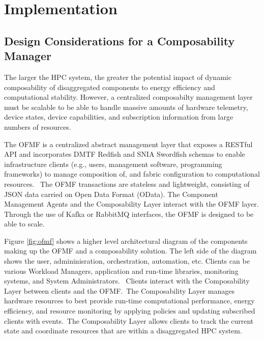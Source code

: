 \section{Implementation}

\subsection{Design Considerations for a Composability Manager}

The larger the HPC system, the greater the potential impact of dynamic composability of disaggregated components to energy efficiency and computational stability.  However, a centralized composabilty management layer must be scalable to be able to handle massive amounts of hardware telemetry, device states, device capabilities, and subscription information from large numbers of resources.  

The OFMF is a centralized abstract management layer that exposes a RESTful API \cite{restful} and incorporates DMTF Redfish \cite{redfish} and SNIA Swordfish \cite{swordfish} schemas to enable infrastructure clients (e.g., users, management software, programming frameworks) to manage composition of, and fabric configuration to computational resources.  The OFMF transactions are stateless and lightweight, consisting of JSON data carried on Open Data Format (OData).  The Component Management Agents and the Composability Layer interact with the OFMF layer.  Through the use of Kafka \cite{kafka} or RabbitMQ \cite{rabbitmq} interfaces, the OFMF is designed to be able to scale.

Figure \ref{fig:ofmf} shows a higher level architectural diagram of the components making up the OFMF and a composability solution.  The left side of the diagram shows the user, admininisration, orchestration, automation, etc. Clients can be various Workload Managers, application and run-time libraries, monitoring systems, and System Administrators.  Clients interact with the Composability Layer between clients and the OFMF. The Composability Layer manages hardware resources to best provide run-time computational performance, energy efficiency, and resource monitoring by applying policies and updating subscribed clients with events. The Composability Layer allows clients to track the current state and coordinate resources that are within a disaggregated HPC system.

